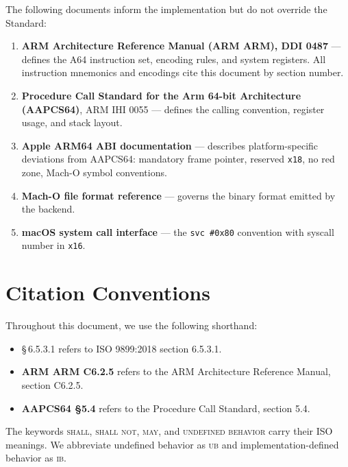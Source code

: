 \documentclass[11pt,a4paper,twoside,openright,DIV=15]{scrbook}
\theoremstyle{definition}
\theoremstyle{plain}
\theoremstyle{remark}
\newcommand{\ub}{\textsc{ub}}
\newcommand{\idb}{\textsc{ib}}
\newcommand{\stdref}[1]{\S\,#1}
\newcommand{\reg}[1]{\texttt{#1}}
\begin{document}
The following documents inform the implementation but do not override
the Standard:

\begin{enumerate}
\item \textbf{ARM Architecture Reference Manual (ARM ARM), DDI 0487}
      --- defines the A64 instruction set, encoding rules, and system
      registers.  All instruction mnemonics and encodings cite this
      document by section number.

\item \textbf{Procedure Call Standard for the Arm 64-bit Architecture
      (AAPCS64)}, ARM IHI 0055 --- defines the calling convention,
      register usage, and stack layout.

\item \textbf{Apple ARM64 ABI documentation} --- describes
      platform-specific deviations from AAPCS64: mandatory frame
      pointer, reserved \reg{x18}, no red zone, Mach-O symbol
      conventions.

\item \textbf{Mach-O file format reference} --- governs the binary
      format emitted by the backend.

\item \textbf{macOS system call interface} --- the \texttt{svc \#0x80}
      convention with syscall number in \reg{x16}.
\end{enumerate}

\section{Citation Conventions}

Throughout this document, we use the following shorthand:

\begin{itemize}
\item \stdref{6.5.3.1} refers to ISO 9899:2018 section 6.5.3.1.
\item \textbf{ARM ARM C6.2.5} refers to the ARM Architecture Reference
      Manual, section C6.2.5.
\item \textbf{AAPCS64 \S5.4} refers to the Procedure Call Standard,
      section 5.4.
\end{itemize}

The keywords \textsc{shall}, \textsc{shall not}, \textsc{may}, and
\textsc{undefined behavior} carry their ISO meanings.  We abbreviate
undefined behavior as \ub{} and implementation-defined behavior
as \idb{}.
%
\end{document}
